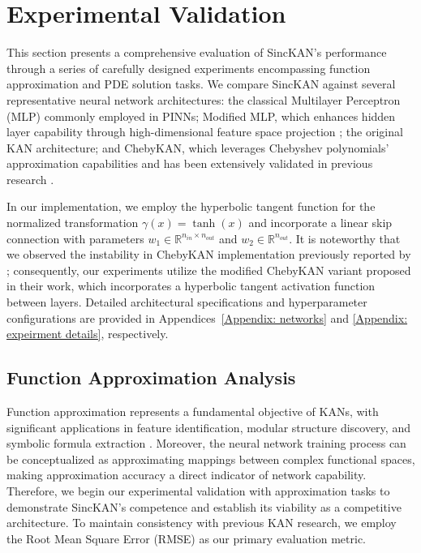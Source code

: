 \section{Experimental Validation}\label{Section: experiments}
This section presents a comprehensive evaluation of SincKAN's performance through a series of carefully designed experiments encompassing function approximation and PDE solution tasks. We compare SincKAN against several representative neural network architectures: the classical Multilayer Perceptron (MLP) commonly employed in PINNs; Modified MLP, which enhances hidden layer capability through high-dimensional feature space projection \citep{wang2021understanding}; the original KAN architecture; and ChebyKAN, which leverages Chebyshev polynomials' approximation capabilities and has been extensively validated in previous research \citep{shukla2024comprehensive}.

In our implementation, we employ the hyperbolic tangent function for the normalized transformation $\gamma(x)=\tanh(x)$ and incorporate a linear skip connection with parameters $w_1 \in \mathbb{R}^{n_{in}\times n_{out}}$ and $w_2 \in \mathbb{R}^{n_{out}}$. It is noteworthy that we observed the instability in ChebyKAN implementation previously reported by \citep{shukla2024comprehensive}; consequently, our experiments utilize the modified ChebyKAN variant proposed in their work, which incorporates a hyperbolic tangent activation function between layers. Detailed architectural specifications and hyperparameter configurations are provided in Appendices~\ref{Appendix: networks} and \ref{Appendix: expeirment details}, respectively.

\subsection{Function Approximation Analysis}
Function approximation represents a fundamental objective of KANs, with significant applications in feature identification, modular structure discovery, and symbolic formula extraction \citep{liu2024kan2}. Moreover, the neural network training process can be conceptualized as approximating mappings between complex functional spaces, making approximation accuracy a direct indicator of network capability. Therefore, we begin our experimental validation with approximation tasks to demonstrate SincKAN's competence and establish its viability as a competitive architecture. To maintain consistency with previous KAN research, we employ the Root Mean Square Error (RMSE) as our primary evaluation metric.


